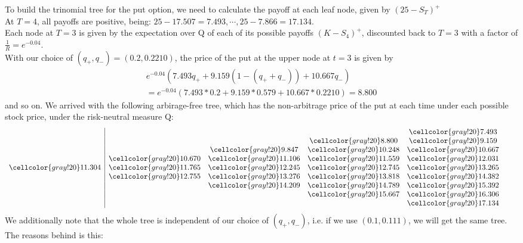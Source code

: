 \begin{example}
To build the trinomial tree for the put option, we need to calculate the payoff at each leaf node, given by $ (25 - S_T)^+ $\\
At $ T = 4$, all payoffs are positive, being: $ 25 - 17.507 = 7.493, \cdots, 25 - 7.866 = 17.134 $.\\
Each node at $ T = 3 $ is given by the expectation over Q of each of its possible payoffs $ (K - S_4)^+ $, discounted back to $ T = 3 $
 with a factor of $ \frac{1}{R} = e^{-0.04} $.\\
With our choice of $ (q_+, q_-) = (0.2, 0.2210) $, the price of the put at
  the upper node at $ t = 3 $ is given by 
\begin{align*}
e^{-0.04} \left( 7.493 q_+ + 9.159 (1 - (q_+ + q_-)) + 10.667 q_- \right) \\
= e^{-0.04} \left( 7.493 * 0.2 + 9.159 * 0.579 + 10.667 * 0.2210 \right) = 8.800
\end{align*}
and so on. We arrived with the following arbirage-free tree, which has the non-arbitrage price of the put at each time under each possible stock price, 
under the risk-neutral measure Q:
\[
\begin{array}{c|cccccc}
 & & & & \cellcolor{gray!20}7.493 & & \\
 & & & \cellcolor{gray!20}8.800 & \cellcolor{gray!20}9.159 & & \\
 & & \cellcolor{gray!20}9.847 & \cellcolor{gray!20}10.248 & \cellcolor{gray!20}10.667 & & \\
 & \cellcolor{gray!20}10.670 & \cellcolor{gray!20}11.106 & \cellcolor{gray!20}11.559 & \cellcolor{gray!20}12.031 & & \\
\cellcolor{gray!20}11.304 & \cellcolor{gray!20}11.765 & \cellcolor{gray!20}12.245 & \cellcolor{gray!20}12.745 & \cellcolor{gray!20}13.265 & & \\
 & \cellcolor{gray!20}12.755 & \cellcolor{gray!20}13.276 & \cellcolor{gray!20}13.818 & \cellcolor{gray!20}14.382 & & \\
 & & \cellcolor{gray!20}14.209 & \cellcolor{gray!20}14.789 & \cellcolor{gray!20}15.392 & & \\
 & & & \cellcolor{gray!20}15.667 & \cellcolor{gray!20}16.306 & & \\
 & & & & \cellcolor{gray!20}17.134 & &
\end{array}
\]
We additionally note that the whole tree is independent of our choice of $ (q_+, q_-) $, 
i.e. if we use $ (0.1, 0.111 ) $, we will get the same tree.\\
The reasons behind is this:\\

\end{example}
